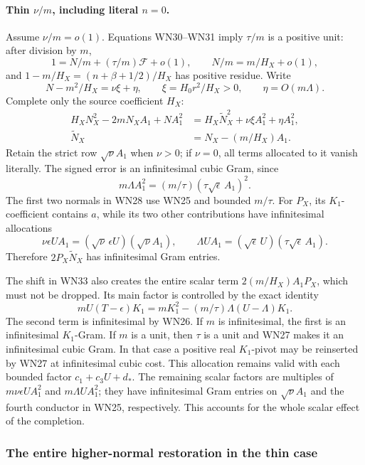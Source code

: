 \paragraph{Thin \(\nu/m\), including literal \(n=0\).}
Assume \(\nu/m=o(1)\). Equations WN30--WN31 imply
\(\tau/m\) is a positive unit: after division by \(m\),
\[
 1=N/m+(\tau/m)\mathcal F+o(1),\qquad
 N/m=m/H_X+o(1),
\]
and \(1-m/H_X=(n+\beta+1/2)/H_X\) has positive residue.
Write
\[
 N-m^2/H_X=\nu\xi+\eta,\qquad
 \xi=H_0r^2/H_X>0,\qquad \eta=O(m\Lambda).
\]
Complete only the source coefficient \(H_X\):
\[
\begin{split}
 H_XN_X^2-2mN_XA_1+NA_1^2
 &=H_X\widetilde N_X^2+\nu\xi A_1^2+\eta A_1^2,\\
 \widetilde N_X&=N_X-(m/H_X)A_1.
\end{split}\tag{WN33}
\]
Retain the strict row \(\sqrt\nu A_1\) when \(\nu>0\);
if \(\nu=0\), all terms allocated to it vanish literally.
The signed error is an infinitesimal cubic Gram, since
\[
 m\Lambda A_1^2=(m/\tau)(\tau\sqrt\epsilon\,A_1)^2.
 \tag{WN34}
\]
The first two normals in WN28 use WN25 and bounded \(m/\tau\).
For \(P_X\), its \(K_1\)-coefficient contains \(a\), while its
two other contributions have infinitesimal allocations
\[
 \nu\epsilon U A_1=(\sqrt\nu\,\epsilon U)(\sqrt\nu A_1),
 \qquad \Lambda U A_1=(\sqrt\epsilon\,U)
                         (\tau\sqrt\epsilon\,A_1).
 \tag{WN35}
\]
Therefore \(2P_X\widetilde N_X\) has infinitesimal Gram entries.

The shift in WN33 also creates the entire scalar term
\(2(m/H_X)A_1P_X\), which must not be dropped.
Its main factor is controlled by the exact identity
\[
 mU(T-\epsilon)K_1
   =mK_1^2-(m/\tau)\Lambda(U-\Lambda)K_1 .
 \tag{WN36}
\]
The second term is infinitesimal by WN26. If \(m\) is
infinitesimal, the first is an infinitesimal \(K_1\)-Gram.
If \(m\) is a unit, then \(\tau\) is a unit and WN27
makes it an infinitesimal cubic Gram. In that case a positive
real \(K_1\)-pivot may be reinserted by WN27 at infinitesimal
cubic cost. This allocation remains valid with each bounded
factor \(c_1+c_3U+d_*\).
The remaining scalar factors are multiples of
\(m\nu\epsilon U A_1^2\) and \(m\Lambda U A_1^2\);
they have infinitesimal Gram entries on \(\sqrt\nu A_1\)
and the fourth conductor in WN25, respectively.
This accounts for the whole scalar effect of the completion.

\subsubsection*{The entire higher-normal restoration in the thin case}

